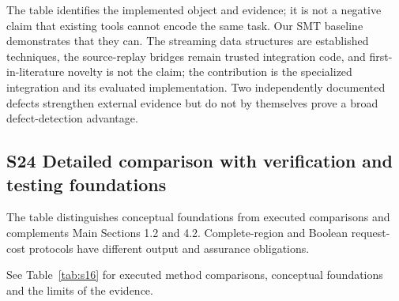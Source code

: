 \documentclass[11pt,a4paper]{article}
\theoremstyle{plain}
\theoremstyle{definition}
\theoremstyle{remark}
\begin{document}
The table identifies the implemented object and evidence; it is not a negative claim that existing tools cannot encode the same task. Our SMT baseline demonstrates that they can. The streaming data structures are established techniques, the source-replay bridges remain trusted integration code, and first-in-literature novelty is not the claim; the contribution is the specialized integration and its evaluated implementation. Two independently documented defects strengthen external evidence but do not by themselves prove a broad defect-detection advantage.


\subsection*{S24 Detailed comparison with verification and testing foundations}\label{sec:s24}

The table distinguishes conceptual foundations from executed comparisons and complements Main Sections 1.2 and 4.2. Complete-region and Boolean request-cost protocols have different output and assurance obligations.

See Table~\ref{tab:s16} for executed method comparisons, conceptual foundations and the limits of the evidence.
\end{document}

